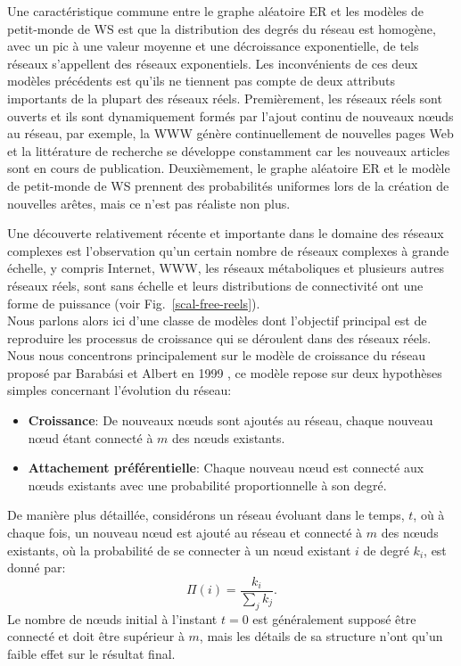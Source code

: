 Une caractéristique commune entre le graphe aléatoire ER et les modèles de petit-monde de WS est que la distribution des degrés du réseau est homogène, avec un pic à une valeur moyenne et une décroissance exponentielle, de tels réseaux s'appellent des réseaux exponentiels. Les inconvénients de ces deux modèles précédents est qu'ils ne tiennent pas compte de deux attributs importants de la plupart des réseaux réels.  Premièrement, les réseaux réels sont ouverts et ils sont dynamiquement formés par l'ajout continu de nouveaux nœuds au réseau, par exemple, la WWW génère continuellement de nouvelles pages Web et la littérature de recherche se développe constamment car les nouveaux articles sont en cours de publication. Deuxièmement, le graphe aléatoire ER et le modèle de petit-monde de WS prennent des probabilités uniformes lors de la création de nouvelles arêtes, mais ce n'est pas réaliste non plus.

Une découverte relativement récente et importante dans le domaine des réseaux complexes est l'observation qu'un certain nombre de réseaux complexes à grande échelle, y compris Internet, WWW, les réseaux métaboliques et plusieurs autres réseaux réels, sont sans échelle et leurs distributions de connectivité ont une forme de puissance (voir Fig.~\ref{scal-free-reels}).\\
Nous parlons alors ici d'une classe de modèles dont l'objectif principal est de reproduire les processus de croissance qui se déroulent dans des réseaux réels. Nous nous concentrons principalement sur le modèle de croissance du réseau proposé par Barabási et Albert en 1999 \cite{BA1999}, ce modèle repose sur deux hypothèses simples concernant l'évolution du réseau:
\begin{itemize}
	\item \textbf{Croissance}: De nouveaux nœuds sont ajoutés au réseau, chaque nouveau nœud étant connecté à $m$ des nœuds existants.
	\item \textbf{Attachement préférentielle}: Chaque nouveau nœud est connecté aux nœuds existants avec une probabilité proportionnelle à son degré.
\end{itemize}
De manière plus détaillée, considérons un réseau évoluant dans le temps, $t$, où à chaque fois, un nouveau nœud est ajouté au réseau et connecté à $m$ des nœuds existants, où la probabilité de se connecter à un nœud existant $i$ de degré $k_i$, est donné par:
\begin{equation}
\Pi(i)=\dfrac{k_i}{\sum_jk_j}.
\label{2-2}
\end{equation}
Le nombre de nœuds initial à l'instant $t=0$ est généralement supposé être connecté et doit être supérieur à $m$, mais les détails de sa structure n'ont qu'un faible effet sur le résultat final.\\

